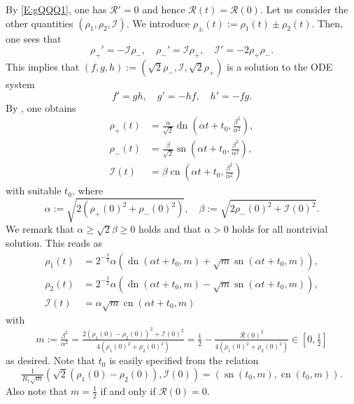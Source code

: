 \documentclass[11pt,a4paper,oneside]{amsart}
\theoremstyle{plain}
\theoremstyle{remark}
\numberwithin{equation}{section}
\def\({\left(}
\def\){\right)}
\def\ge{\geqslant}
\DeclareMathOperator{\sn}{sn}
\DeclareMathOperator{\cn}{cn}
\DeclareMathOperator{\dn}{dn}
\theoremstyle{definition}
\begin{document}
By \eqref{E:gQQQ1}, one has $\mathcal{R}'=0$ and hence $\mathcal{R}(t)=\mathcal{R}(0)$.
Let us consider the other quantities $(\rho_1,\rho_2,\mathcal{I})$.
We introduce $\rho_\pm(t):= \rho_1(t) \pm \rho_2(t)$.
Then, one sees that
\[
	\rho_+' =  -\mathcal{I} \rho_- ,\quad
	\rho_-' = \mathcal{I} \rho_+, \quad \mathcal{I}' = -2\rho_+\rho_-.
\]
This implies that $(f,g,h):=(\sqrt2 \rho_-, \mathcal{I}, \sqrt{2} \rho_+)$ is a solution to the ODE system
\[
	f' = gh, \quad g' = -hf, \quad h' = -fg.
\]
By \cite[Lemma 2.4]{M3}, one obtains
\begin{align*}
	\rho_+(t) &= \tfrac{\alpha}{\sqrt2} \dn\( \alpha t+t_0, \tfrac{\beta^2}{\alpha^2 } \),\\
	\rho_-(t) &= \tfrac{\beta}{\sqrt2}\sn\( \alpha t+t_0, \tfrac{\beta^2}{\alpha^2 } \),\\
	\mathcal{I}(t) &
	=\beta\cn\( \alpha t+t_0 , \tfrac{\beta^2}{\alpha^2 } \)
\end{align*}
with suitable $t_0$, where
\[
	\alpha := \sqrt{2(\rho_+(0)^2+\rho_-(0)^2)} , \quad 
	\beta := \sqrt{2\rho_-(0)^2+\mathcal{I}(0)^2}.
\]
We remark that $\alpha \ge \sqrt2 \beta \ge 0$ holds and
that $\alpha>0$ holds for all nontrivial solution.
This reads as
\begin{align*}
	\rho_1(t) &= 2^{-\frac32} \alpha \( \dn\( \alpha t + t_0, m \)+ \sqrt{m} \sn\( \alpha t + t_0, m \)\) ,\\
	\rho_2(t) &= 2^{-\frac32} \alpha \( \dn\( \alpha t + t_0, m \)-\sqrt{m} \sn\( \alpha t + t_0, m \)\) ,\\
	\mathcal{I}(t) &
	=\alpha \sqrt{m} \cn\( \alpha t + t_0, m\)
\end{align*}
with
\[
	m := \tfrac{\beta^2}{\alpha^2}=\tfrac{2(\rho_1(0)-\rho_2(0))^2+\mathcal{I}(0)^2}{4(\rho_1(0)^2+\rho_2(0)^2)} 
	= \tfrac12 - \tfrac{\mathcal{R}(0)^2}{4(\rho_1(0)^2+\rho_2(0)^2)} \in [0,\tfrac12]
\]
as desired.
Note that $t_0$ is easily specified from the relation
\[
	\tfrac1{R_1 \sqrt{m} }(\sqrt2 (\rho_1(0)-\rho_2(0)),\mathcal{I}(0))
	=(\sn(t_0, m ),\cn( t_0, m )).
\]
Also note that $ m = \frac12 $ if and only if
$\mathcal{R}(0)=0$.
\end{document}
